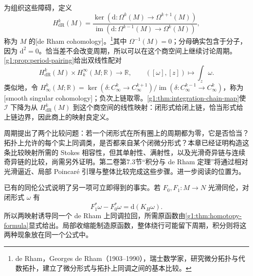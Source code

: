 为组织这些障碍，定义
\begin{equation}\label{g1:eq:de-rham-cohomology-definition}
	H_{\mathrm{dR}}^k(M)=
	\frac{\ker(\mathrm{d}:\Omega^k(M)\to\Omega^{k+1}(M))}
	{\operatorname{im}(\mathrm{d}:\Omega^{k-1}(M)\to\Omega^k(M))},
\end{equation}
称为 \(M\) 的[de Rham cohomology]。\footnote{de Rham，Georges de Rham（1903--1990），瑞士数学家，研究微分拓扑与代数拓扑，建立了微分形式与拓扑上同调之间的基本比较。}其中 \(\Omega^{-1}(M)=0\)；分母确实包含于分子，因为 \(\mathrm{d}^2=0\)。恰当差不会改变周期，所以可以在这个商空间上继续讨论周期。\cref{g1:prop:period-pairing}给出双线性配对
\[
	H_{\mathrm{dR}}^k(M)\times H_k^\infty(M;\mathbb R)\longrightarrow\mathbb R,
	\qquad ([\omega],[z])\longmapsto\int_z\omega.
\]
类似地，令 \(H^k_\infty(M;\mathbb R)=\ker(\delta:C^k_\infty\to C^{k+1}_\infty)/\operatorname{im}(\delta:C^{k-1}_\infty\to C^k_\infty)\)，称为[smooth singular cohomology]；负次上链取零。\cref{g1:thm:integration-chain-map}使 \(\mathcal I\) 下降为从 \(H_{\mathrm{dR}}^k(M)\) 到这个商空间的线性映射：闭形式给闭上链，恰当形式给上链边界，因此商上的映射良定义。

\ProseParagraphBreak

周期提出了两个比较问题：若一个闭形式在所有圈上的周期都为零，它是否恰当？拓扑上允许的每个实上同调类，是否都来自某个闭微分形式？本章已经证明构造这条比较映射所需的 Stokes 相容性，但其单射性、满射性，以及光滑奇异链与连续奇异链的比较，尚需另外证明。第二卷第7.3节“积分与 de Rham 定理”将通过相对光滑逼近、局部 Poincaré 引理与整体比较完成这些步骤。进一步阅读的位置为\cite[第18章, Smooth Singular Homology, 第473--479页; The de Rham Theorem, 第480--486页]{Lee2012Smooth}。

\ProseParagraphBreak

已有的同伦公式说明了另一项可立即得到的事实。若 \(F_0,F_1:M\to N\) 光滑同伦，对闭形式 \(\omega\) 有
\[
	F_1^*\omega-F_0^*\omega=\mathrm{d}(K_H\omega).
\]
所以两映射诱导同一个 de Rham 上同调拉回，所需原函数由\cref{g1:thm:homotopy-formula}显式给出。局部收缩能制造原函数，整体绕行可能留下周期，积分则将这两种现象放在同一个公式中。

